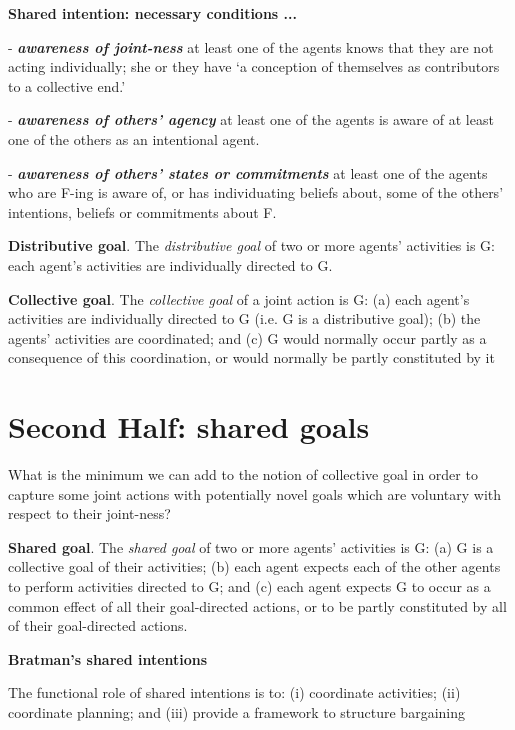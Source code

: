 \documentclass[12pt]{extarticle}
\begin{document}
\begin{multicols}{3}
\textbf{Shared intention: necessary conditions ...}


- \emph{\textbf{awareness of joint-ness}} at least one of the agents knows that they are not acting individually; she or they have `a conception of themselves as contributors to a collective end.' \citep[p.\ 10]{Kutz:2000si}

- \emph{\textbf{awareness of others' agency}}  at least one of the agents is aware of at least one of the others as an intentional agent.

- \emph{\textbf{awareness of others' states or commitments}} at least one of the agents who are F-ing is aware of, or has individuating beliefs about, some of the others' intentions, beliefs or commitments about F.

\textbf{Distributive goal}.  The \emph{distributive goal} of two or more agents' activities is G: each agent's activities are individually directed to G.

\textbf{Collective goal}.  The \emph{collective goal} of a joint action is G:
(a) each agent’s activities are individually directed to G (i.e. G is a distributive goal);
(b) the agents’ activities are coordinated; and 
(c) G would normally occur partly as a consequence of this coordination, or would normally be partly constituted by it






\section{Second Half: shared goals}
What is the minimum we can add to the notion of collective goal in order to capture some joint actions with potentially novel goals which are voluntary with respect to their joint-ness?


\textbf{Shared goal}.  The \emph{shared goal} of two or more agents' activities is G: (a) G is a collective goal of their activities; (b) each agent expects each of the other agents to perform activities directed to G; and (c) each agent expects G to occur as a common effect of all their goal-directed actions, or to be partly constituted by all of their goal-directed actions.



\textbf{Bratman's shared intentions}

The functional role of shared intentions is to: 
(i) coordinate activities; (ii) coordinate planning; and (iii) provide a framework to structure bargaining \citep[p.\ 99]{Bratman:1993je}


\end{multicols}
\end{document}
